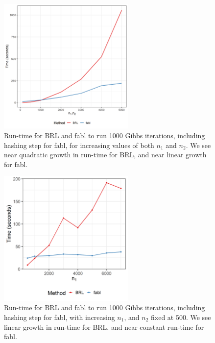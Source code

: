 \documentclass[ba]{imsart}
\begin{document}
	\begin{figure}[h!]
		\begin{center} \includegraphics[width=0.6\textwidth]{../notes/figures/sadinle_speed_plot_slides2} 
			\caption{Run-time for BRL and fabl to run 1000 Gibbs iterations, including hashing step for fabl, for increasing values of both $n_1$ and $n_2$. We see near quadratic growth in run-time for BRL, and near linear growth for fabl.}\label{fig:app-speed1}
		\end{center}
	\end{figure}
	
	\begin{figure}[h!]
		\begin{center} \includegraphics[width=0.6\textwidth]{../notes/figures/speed_plot_fixed_nB_slides2} 
			\caption{Run-time for BRL and fabl to run 1000 Gibbs iterations, including hashing step for fabl, with increasing $n_1$, and $n_2$ fixed at 500. We see linear growth in run-time for BRL, and near constant run-time for fabl.}\label{fig:app-speed2}
		\end{center}
	\end{figure}
\end{document}
